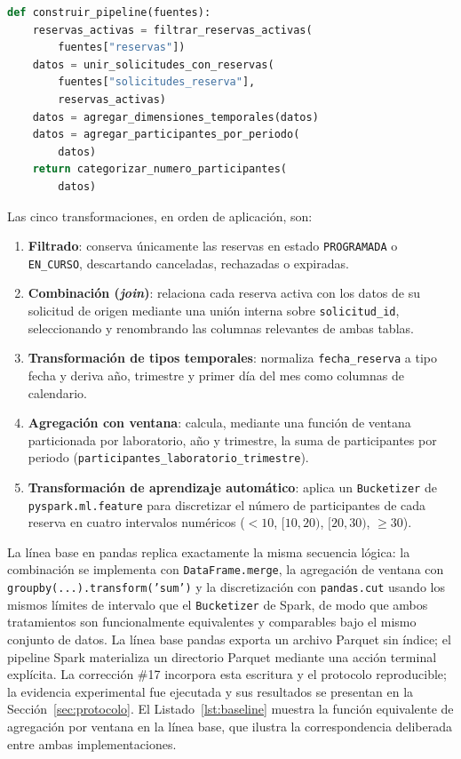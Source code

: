 \documentclass[10pt,twocolumn]{article}
\begin{document}
\begin{lstlisting}[language=Python,caption={Composición de las cinco transformaciones del pipeline (\texttt{spark/pipeline.py}).},label={lst:pipeline}]
def construir_pipeline(fuentes):
    reservas_activas = filtrar_reservas_activas(
        fuentes["reservas"])
    datos = unir_solicitudes_con_reservas(
        fuentes["solicitudes_reserva"],
        reservas_activas)
    datos = agregar_dimensiones_temporales(datos)
    datos = agregar_participantes_por_periodo(
        datos)
    return categorizar_numero_participantes(
        datos)
\end{lstlisting}

Las cinco transformaciones, en orden de aplicación, son:

\begin{enumerate}[leftmargin=*,itemsep=1pt]
  \item \textbf{Filtrado}: conserva únicamente las reservas en estado
  \texttt{PROGRAMADA} o \texttt{EN\_CURSO}, descartando canceladas,
  rechazadas o expiradas.
  \item \textbf{Combinación (\emph{join})}: relaciona cada reserva activa
  con los datos de su solicitud de origen mediante una unión interna sobre
  \texttt{solicitud\_id}, seleccionando y renombrando las columnas
  relevantes de ambas tablas.
  \item \textbf{Transformación de tipos temporales}: normaliza
  \texttt{fecha\_reserva} a tipo fecha y deriva año, trimestre y primer día
  del mes como columnas de calendario.
  \item \textbf{Agregación con ventana}: calcula, mediante una función de
  ventana particionada por laboratorio, año y trimestre, la suma de
  participantes por periodo (\texttt{participantes\_laboratorio\_trimestre}).
  \item \textbf{Transformación de aprendizaje automático}: aplica un
  \texttt{Bucketizer} de \texttt{pyspark.ml.feature} para discretizar el
  número de participantes de cada reserva en cuatro intervalos numéricos
  ($<10$, $[10,20)$, $[20,30)$, $\geq 30$).
\end{enumerate}

La línea base en pandas replica exactamente la misma secuencia lógica: la
combinación se implementa con \texttt{DataFrame.merge}, la agregación de
ventana con \texttt{groupby(...).transform('sum')} y la discretización con
\texttt{pandas.cut} usando los mismos límites de intervalo que el
\texttt{Bucketizer} de Spark, de modo que ambos tratamientos son
funcionalmente equivalentes y comparables bajo el mismo conjunto de datos.
La línea base pandas exporta un archivo Parquet sin índice; el pipeline Spark
materializa un directorio Parquet mediante una acción terminal explícita.
La corrección \#17 incorpora esta escritura y el protocolo reproducible;
la evidencia experimental fue ejecutada y sus resultados se presentan en la
Sección~\ref{sec:protocolo}. El
Listado~\ref{lst:baseline} muestra la función equivalente de agregación por
ventana en la línea base, que ilustra la correspondencia deliberada entre
ambas implementaciones.
\end{document}
